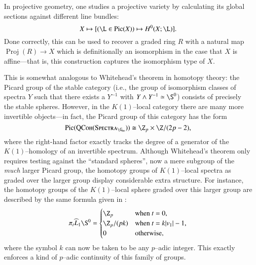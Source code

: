 In projective geometry, one studies a projective variety by calculating its global sections against different line bundles: \[X \mapsto [(\L \in \Pic(X)) \mapsto H^0(X; \L)].\]  Done correctly, this can be used to recover a graded ring $R$ with a natural map $\operatorname{Proj}(R) \to X$ which is definitionally an isomorphism in the case that $X$ is affine---that is, this construction captures the isomorphism type of $X$.

This is somewhat analogous to Whitehead's theorem in homotopy theory: the Picard group of the stable category (i.e., the group of isomorphism classes of spectra $Y$ such that there exists a $Y^{-1}$ with $Y \sm Y^{-1} \simeq \S^0$) consists of precisely the stable spheres.  However, in the $K(1)$--local category there are many more invertible objects---in fact, the Picard group of this category has the form \[\operatorname{Pic}(\CatOf{QCoh}(\CatOf{Spectra}_{\G_m})) \cong \Z_p \times \Z / (2p-2),\] where the right-hand factor exactly tracks the degree of a generator of the $K(1)$--homology of an invertible spectrum.  Although Whitehead's theorem only requires testing against the ``standard spheres'', now a mere subgroup of the \emph{much} larger Picard group, the homotopy groups of $K(1)$--local spectra as graded over the larger group display considerable extra structure.  For instance, the homotopy groups of the $K(1)$--local sphere graded over this larger group are described by the same formula given in : \[\pi_t \widehat L_1 \S^0 = \begin{cases} \Z_p & \text{when $t = 0$}, \\ \Z_p / (pk) & \text{when $t = k|v_1| - 1$}, \\ 0 & \text{otherwise}, \end{cases}\] where the symbol $k$ can now be taken to be any $p$--adic integer.  This exactly enforces a kind of $p$--adic continuity of this family of groups.

